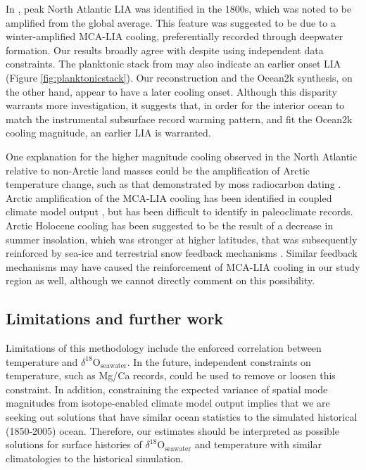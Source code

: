 \documentclass[draft]{agujournal2019}
\begin{document}
In , peak North Atlantic LIA was identified in the
1800s, which was noted to be amplified from the global average. This
feature was suggested to be due to a winter-amplified MCA-LIA cooling,
preferentially recorded through deepwater formation.
Our results broadly agree with  despite using independent data constraints. The planktonic stack from  may also indicate an earlier onset LIA (Figure \ref{fig:planktonicstack}). Our reconstruction and the Ocean2k synthesis, on the other hand, appear to have a later cooling onset. Although this disparity warrants more investigation, it suggests that, in order for the interior ocean to match the instrumental subsurface record warming pattern, and fit the Ocean2k cooling magnitude, an earlier LIA is warranted. 

One explanation for the higher magnitude cooling observed in the North
Atlantic relative to non-Arctic land masses could be the amplification
of Arctic temperature change, such as that demonstrated
by moss radiocarbon dating \cite{miller12}. Arctic amplification of the MCA-LIA
cooling has been identified in coupled climate model output
\cite{ottobliesner16}, but has been difficult to identify in
paleoclimate records. Arctic Holocene cooling has been suggested to be
the result of a decrease in summer insolation, which was stronger at
higher latitudes, that was subsequently reinforced by sea-ice and
terrestrial snow feedback mechanisms \cite[]{Kaufman2009}. Similar
feedback mechanisms may have caused the reinforcement of MCA-LIA
cooling in our study region as well, although we cannot directly comment on this possibility.

\subsection{Limitations and further work \label{sec:limit}}

Limitations of this methodology include the enforced correlation
between temperature and $\delta^{18}\mathrm{O}_{\mathrm{seawater}}$. In the
future, independent constraints on temperature, such as Mg/Ca records,
could be used to remove or loosen this constraint. In
addition, constraining the expected variance of spatial mode
magnitudes from isotope-enabled climate model output implies that we
are seeking out solutions that have similar ocean statistics to the
simulated historical (1850-2005) ocean. Therefore, our estimates
should be interpreted as possible solutions for surface histories of
$\delta^{18}\mathrm{O}_{\mathrm{seawater}}$ and temperature
with similar climatologies to the historical simulation.
\end{document}
